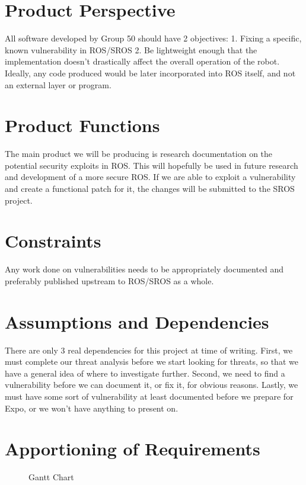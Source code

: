 \documentclass{scrreprt}
\begin{document}
\section{Product Perspective}
All software developed by Group 50 should have 2 objectives:
1. Fixing a specific, known vulnerability in ROS/SROS
2. Be lightweight enough that the implementation doesn't drastically affect the overall operation of the robot. Ideally, any code produced would be later incorporated into ROS itself, and not an external layer or program.

\section{Product Functions}
The main product we will be producing is research documentation on the potential security exploits in ROS.
This will hopefully be used in future research and development of a more secure ROS.
If we are able to exploit a vulnerability and create a functional patch for it, the changes will be submitted to the SROS project.

\section{Constraints}
Any work done on vulnerabilities needs to be appropriately documented and preferably published upstream to ROS/SROS as a whole.

\section{Assumptions and Dependencies}
There are only 3 real dependencies for this project at time of writing. First, we must complete our threat analysis before we start looking for threats,
so that we have a general idea of where to investigate further. Second, we need to find a vulnerability before we can document it, or fix it, for obvious reasons.
Lastly, we must have some sort of vulnerability at least documented before we prepare for Expo, or we won't have anything to present on.

\section{Apportioning of Requirements}
  \begin{center}
    \begin{figure}
      \caption{Gantt Chart}
      \label{fig:gantt}
    \end{figure}
  \end{center}
\end{document}
